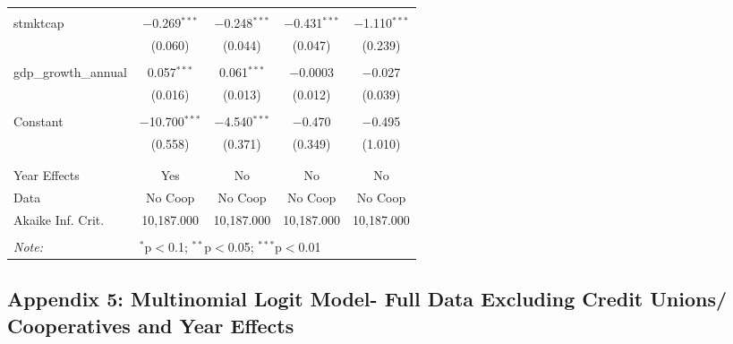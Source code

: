 \documentclass[a4paper,nobind]{templates/ociamthesis}
\begin{document}
\begin{table}[!htbp]
\begin{tabular}{@{\extracolsep{5pt}}lcccc}
  & & & & \\ 
 stmktcap & $-$0.269$^{***}$ & $-$0.248$^{***}$ & $-$0.431$^{***}$ & $-$1.110$^{***}$ \\ 
  & (0.060) & (0.044) & (0.047) & (0.239) \\ 
  & & & & \\ 
 gdp\_growth\_annual & 0.057$^{***}$ & 0.061$^{***}$ & $-$0.0003 & $-$0.027 \\ 
  & (0.016) & (0.013) & (0.012) & (0.039) \\ 
  & & & & \\ 
 Constant & $-$10.700$^{***}$ & $-$4.540$^{***}$ & $-$0.470 & $-$0.495 \\ 
  & (0.558) & (0.371) & (0.349) & (1.010) \\ 
  & & & & \\ 
\hline \\[-1.8ex] 
Year Effects & Yes & No & No & No \\ 
Data & No Coop & No Coop & No Coop & No Coop \\ 
Akaike Inf. Crit. & 10,187.000 & 10,187.000 & 10,187.000 & 10,187.000 \\ 
\hline 
\hline \\[-1.8ex] 
\textit{Note:}  & \multicolumn{4}{l}{$^{*}$p$<$0.1; $^{**}$p$<$0.05; $^{***}$p$<$0.01} \\ 
\end{tabular} 
\end{table}

\newpage

\hypertarget{appendix-5-multinomial-logit-model--full-data-excluding-credit-unions-cooperatives-and-year-effects}{%
\subsection{Appendix 5: Multinomial Logit Model- Full Data Excluding Credit Unions/ Cooperatives and Year Effects}\label{appendix-5-multinomial-logit-model--full-data-excluding-credit-unions-cooperatives-and-year-effects}}
\end{document}
